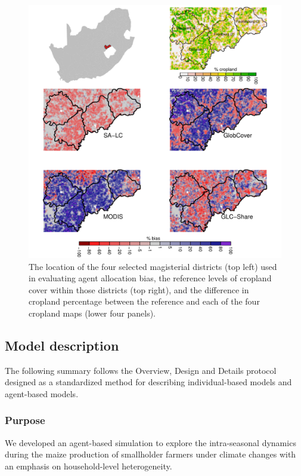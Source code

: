 \documentclass[12pt, titlepage]{article}
\begin{document}
\begin{figure}[!ht]
  \centering
     \includegraphics[width = 12cm]{figures/abm-selected-districts.pdf} 
      \caption{The location of the four selected magisterial districts (top left) used in evaluating agent allocation bias, the reference levels of cropland cover within those districts (top right), and the difference in cropland percentage between the reference and each of the four cropland maps (lower four panels). }
      \label{fig:abmdists}
\end{figure}

\subsection{\large Model description}

The following summary follows the Overview, Design and Details protocol \citep{grimm_standard_2006,polhill_using_2008} designed as a standardized method for describing individual-based models and agent-based models.

\subsubsection{Purpose} 
We developed an agent-based simulation to explore the intra-seasonal dynamics during the maize production of smallholder farmers under climate changes with an emphasis on household-level heterogeneity.
\end{document}
